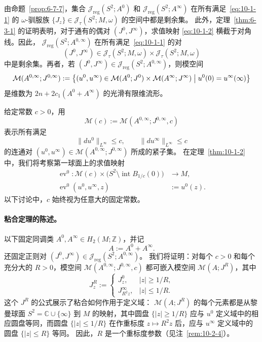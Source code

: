 由命题~\ref{prop:6-7-7}，集合
$\mathcal J_{\mathrm{reg}}(S^2;A^0)$ 和
$\mathcal J_{\mathrm{reg}}(S^2;A^\infty)$ 在所有满足~\eqref{eq:10-1-1} 的
$\omega$-驯服族 $\{J_z\}\in\mathcal J_\tau(S^2;M,\omega)$ 的空间中都是剩余集。
此外，定理~\ref{thm:6-3-1} 的证明表明，对于通有的偶对 $(J^0,J^\infty)$，求值映射
\eqref{eq:10-1-2} 横截于对角线。因此，
$\mathcal J_{\mathrm{reg}}(S^2;A^{0,\infty})$ 在所有满足~\eqref{eq:10-1-1} 的对
\[
  (J^0,J^\infty)\in\mathcal J_\tau(S^2;M,\omega)\times
  \mathcal J_\tau(S^2;M,\omega)
\]
中是剩余集。再者，若
$(J^0,J^\infty)\in\mathcal J_{\mathrm{reg}}(S^2;A^{0,\infty})$，则模空间
\[
  \mathcal M(A^{0,\infty};J^{0,\infty})
  :=\bigl\{(u^0,u^\infty)\in
  \mathcal M(A^0;J^0)\times\mathcal M(A^\infty;J^\infty)
  \bigm|u^0(0)=u^\infty(\infty)\bigr\}
\]
是维数为 $2n+2c_1(A^0+A^\infty)$ 的光滑有限维流形。

给定常数 $c>0$，用
\[
  \mathcal M(c):=\mathcal M(A^{0,\infty};J^{0,\infty},c)
\]
表示所有满足
\[
  \|du^0\|_{L^\infty}\le c,
  \qquad
  \|du^\infty\|_{L^\infty}\le c
\]
的连通对 $(u^0,u^\infty)\in\mathcal M(A^{0,\infty};J^{0,\infty})$ 所成的紧子集。
在定理~\ref{thm:10-1-2} 中，我们将考察第一球面上的求值映射
\begin{equation}\label{eq:10-1-3}
  \begin{aligned}
  \operatorname{ev}^0:\mathcal M(c)\times
  \bigl(S^2\setminus\operatorname{int}B_{1/c}(0)\bigr)&\longrightarrow M,\\
  \operatorname{ev}^0(u^0,u^\infty,z)&:=u^0(z).
  \end{aligned}
\end{equation}
以下讨论中，$c$ 始终视为任意大的固定常数。

\paragraph{粘合定理的陈述。}
以下固定同调类 $A^0,A^\infty\in H_2(M;\mathbb Z)$，并记
\[
  A:=A^0+A^\infty.
\]
还固定正则对
$(J^0,J^\infty)\in\mathcal J_{\mathrm{reg}}(S^2;A^{0,\infty})$。
我们将证明：对每个 $c>0$ 和每个充分大的 $R>0$，模空间
$\mathcal M(A^{0,\infty};J^{0,\infty},c)$ 都可嵌入模空间
$\mathcal M(A;J^R)$，其中
\begin{equation}\label{eq:10-1-4}
  J_z^R:=
  \begin{cases}
    J_z^0,& |z|\ge 1/R,\\
    J_{R^2z}^\infty,& |z|\le 1/R.
  \end{cases}
\end{equation}
这个 $J^R$ 的公式展示了粘合如何作用于定义域：
$\mathcal M(A;J^R)$ 的每个元素都是从黎曼球面
$S^2=\mathbb C\cup\{\infty\}$ 到 $M$ 的映射，其中圆盘 $\{|z|\ge1/R\}$ 应与
$u^0$ 定义域中的相应圆盘等同，而圆盘 $\{|z|\le1/R\}$ 在作重标度
$z\mapsto R^2z$ 后，应与 $u^\infty$ 定义域中的圆盘 $\{|z|\le R\}$ 等同。
因此，$R$ 是一个重标度参数（见注~\ref{rem:10-2-4}）。

